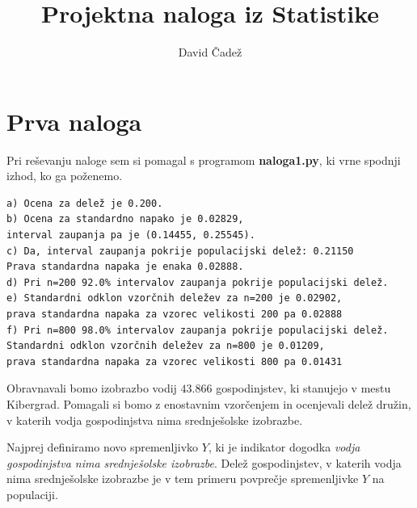 \documentclass{article}
\title{Projektna naloga iz Statistike}
\author{David Čadež}
\date{}
\begin{document}
\maketitle

\section{Prva naloga}

Pri reševanju naloge sem si pomagal s programom \textbf{naloga1.py}, ki vrne
spodnji izhod, ko ga poženemo.
\begin{verbatim}
a) Ocena za delež je 0.200.
b) Ocena za standardno napako je 0.02829,
interval zaupanja pa je (0.14455, 0.25545).
c) Da, interval zaupanja pokrije populacijski delež: 0.21150
Prava standardna napaka je enaka 0.02888.
d) Pri n=200 92.0% intervalov zaupanja pokrije populacijski delež.
e) Standardni odklon vzorčnih deležev za n=200 je 0.02902,
prava standardna napaka za vzorec velikosti 200 pa 0.02888
f) Pri n=800 98.0% intervalov zaupanja pokrije populacijski delež.
Standardni odklon vzorčnih deležev za n=800 je 0.01209,
prava standardna napaka za vzorec velikosti 800 pa 0.01431
\end{verbatim}

Obravnavali bomo izobrazbo vodij $43.866$ gospodinjstev, ki stanujejo v mestu
Kibergrad. Pomagali si bomo z enostavnim vzorčenjem in ocenjevali delež družin,
v katerih vodja gospodinjstva nima srednješolske izobrazbe.

Najprej definiramo novo spremenljivko $Y$, ki je indikator dogodka \emph{vodja
gospodinjstva nima srednješolske izobrazbe}. Delež gospodinjstev, v katerih
vodja nima srednješolske izobrazbe je v tem primeru povprečje spremenljivke $Y$
na populaciji.
\end{document}
